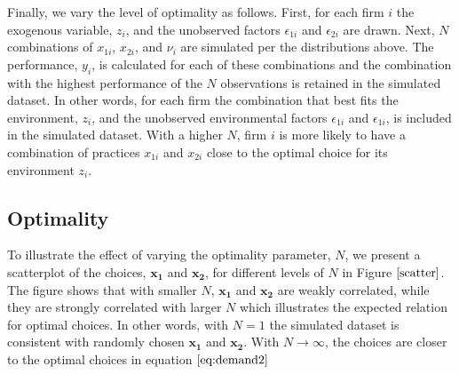 \documentclass[12pt]{article}
\begin{document}
Finally, we vary the level of optimality as follows. First, for each
firm \(i\) the exogenous variable, \(z_i\), and the unobserved factors
\(\epsilon_{1i}\) and \(\epsilon_{2i}\) are drawn. Next, \(N\)
combinations of \(x_{1i}\), \(x_{2i}\), and \(\nu_i\) are simulated per
the distributions above. The performance, \(y_i\), is calculated for
each of these combinations and the combination with the highest
performance of the \(N\) observations is retained in the simulated
dataset. In other words, for each firm the combination that best fits
the environment, \(z_i\), and the unobserved environmental factors
\(\epsilon_{1i}\) and \(\epsilon_{1i}\), is included in the simulated
dataset. With a higher \(N\), firm \(i\) is more likely to have a
combination of practices \(x_{1i}\) and \(x_{2i}\) close to the optimal
choice for its environment \(z_i\).

\subsection{Optimality}\label{optimality}

To illustrate the effect of varying the optimality parameter, \(N\), we
present a scatterplot of the choices, \(\mathbf{x_1}\) and
\(\mathbf{x_2}\), for different levels of \(N\) in Figure
\(\ref{scatter}\). The figure shows that with smaller \(N\),
\(\mathbf{x_1}\) and \(\mathbf{x_2}\) are weakly correlated, while they
are strongly correlated with larger \(N\) which illustrates the expected
relation for optimal choices. In other words, with \(N=1\) the simulated
dataset is consistent with randomly chosen \(\mathbf{x_1}\) and
\(\mathbf{x_2}\). With \(N \to \infty\), the choices are closer to the
optimal choices in equation \(\eqref{eq:demand2}\)
\end{document}
